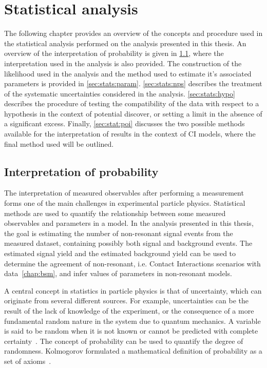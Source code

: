 \chapter{Statistical analysis}\label{chap:stats}
The following chapter provides an overview of the concepts and procedure used in the statistical analysis performed on the analysis presented in this thesis. An overview of the interpretation of probability is given in \cref{sec:stats:interp}, where the interpretation used in the analysis is also provided. The construction of the likelihood used in the analysis and the method used to estimate it's associated parameters is provided in \cref{sec:stats:param}. \cref{sec:stats:nps} describes the treatment of the systematic uncertainties considered in the analysis. \cref{sec:stats:hypo} describes the procedure of testing the compatibility of the data with respect to a hypothesis in the context of potential discover, or setting a limit in the absence of a significant excess. Finally, \cref{sec:stat:poi} discusses the two possible methods available for the interpretation of results in the context of CI models, where the final method used will be outlined.

\section{Interpretation of probability}\label{sec:stats:interp}
The interpretation of measured observables after performing a measurement forms one of the main challenges in experimental particle physics. Statistical methods are used to quantify the relationship between some measured observables and parameters in a model. In the analysis presented in this thesis, the goal is estimating the number of non-resonant signal events from the measured dataset, containing possibly both signal and background events. The estimated signal yield and the estimated background yield can be used to determine the agreement of non-resonant, i.e. Contact Interactions scenarios with data~\cref{chap:bsm}, and infer values of parameters in non-resonant models. 

A central concept in statistics in particle physics is that of uncertainty, which can originate from several different sources. For example, uncertainties can be the result of the lack of knowledge of the experiment, or the consequence of a more fundamental random nature in the system due to quantum mechanics. A variable is said to be random when it is not known or cannot be predicted with complete certainty~\cite{Cowan1998}. The concept of probability can be used to quantify the degree of randomness. Kolmogorov formulated a mathematical definition of probability as a set of axioms~\cite{Kol33}. 

